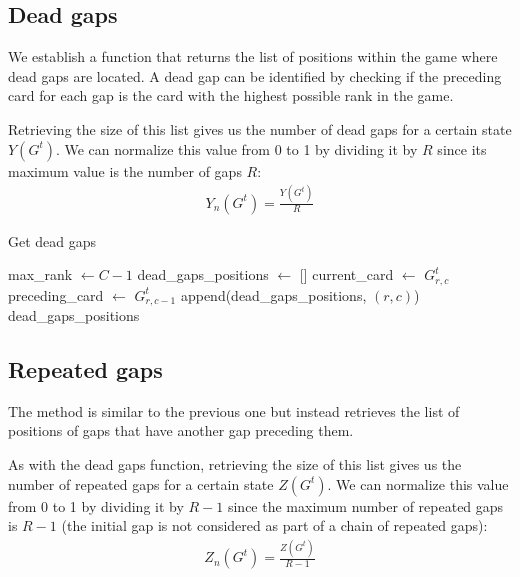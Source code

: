 \newpage
\subsection{Dead gaps}
We establish a function that returns the list of positions within the game where dead gaps are located. A dead gap can be identified by checking if the preceding card for each gap is the card with the highest possible rank in the game.

Retrieving the size of this list gives us the number of dead gaps for a certain state $Y\left(G^t\right)$. We can normalize this value from 0 to 1 by dividing it by $R$ since its maximum value is the number of gaps $R$:
\begin{align}
    Y_n\left(G^t\right) = \frac{Y\left(G^t\right)}{R}
\end{align}

\begin{algorithm}[H]
    \caption{Get dead gaps}
    \begin{algorithmic}
        \State max\_rank $\gets C-1$
        \State dead\_gaps\_positions $\gets$ []
                \State current\_card $\gets$ $G^t_{r,c}$
                \State preceding\_card $\gets$ $G^t_{r,c - 1}$
                    \State append(dead\_gaps\_positions, $(r,c)$)
                \EndIf
            \EndFor
        \EndFor
        \Return dead\_gaps\_positions
    \end{algorithmic}
\end{algorithm}

\subsection{Repeated gaps}
The method is similar to the previous one but instead retrieves the list of positions of gaps that have another gap preceding them.

As with the dead gaps function, retrieving the size of this list gives us the number of repeated gaps for a certain state $Z\left(G^t\right)$. We can normalize this value from 0 to 1 by dividing it by $R-1$ since the maximum number of repeated gaps is $R-1$ (the initial gap is not considered as part of a chain of repeated gaps):
\begin{align}
    Z_n\left(G^t\right) = \frac{Z\left(G^t\right)}{R-1}
\end{align}

